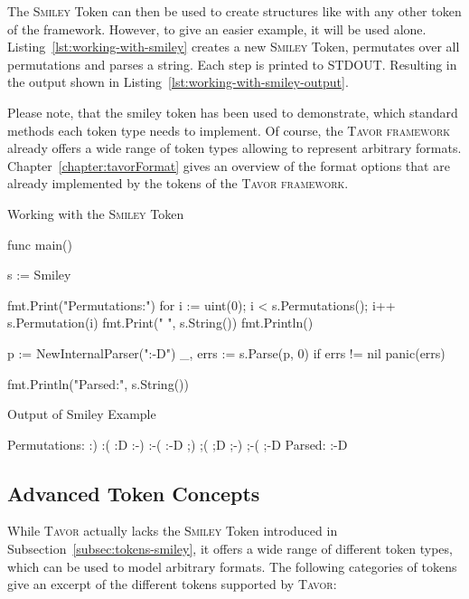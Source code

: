 The \textsc{Smiley} Token can then be used to create structures like with any other token of the framework. However, to give an easier example, it will be used alone. Listing~\ref{lst:working-with-smiley} creates a new \textsc{Smiley} Token, permutates over all permutations and parses a string. Each step is printed to STDOUT. Resulting in the output shown in Listing~\ref{lst:working-with-smiley-output}.

Please note, that the smiley token has been used to demonstrate, which standard methods each token type needs to implement. Of course, the \textsc{Tavor framework} already offers a wide range of token types allowing to represent arbitrary formats. Chapter~\ref{chapter:tavorFormat} gives an overview of the format options that are already implemented by the tokens of the \textsc{Tavor framework}.

\begin{listing}
\caption{Working with the \textsc{Smiley} Token}
\label{lst:working-with-smiley}
\begin{gocode}
func main() {
	s := Smiley{}

	fmt.Print("Permutations:")
	for i := uint(0); i < s.Permutations(); i++ {
		s.Permutation(i)
		fmt.Print(" ", s.String())
	}
	fmt.Println()

	p := NewInternalParser(":-D")
	_, errs := s.Parse(p, 0)
	if errs != nil {
		panic(errs)
	}

	fmt.Println("Parsed:", s.String())
}
\end{gocode}
\end{listing}

\begin{listing}
\caption{Output of Smiley Example}
\label{lst:working-with-smiley-output}
\begin{textcode}
Permutations: :) :( :D :-) :-( :-D ;) ;( ;D ;-) ;-( ;-D
Parsed: :-D
\end{textcode}
\end{listing}

\subsection{Advanced Token Concepts}
\label{subsec:tokens-advanced-concepts}

While \textsc{Tavor} actually lacks the \textsc{Smiley} Token introduced in Subsection~\ref{subsec:tokens-smiley}, it offers a wide range of different token types, which can be used to model arbitrary formats.
The following categories of tokens give an excerpt of the different tokens supported by \textsc{Tavor}:

